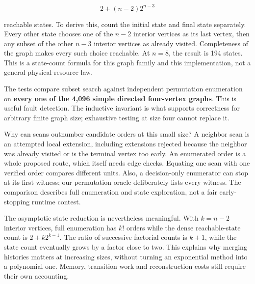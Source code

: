 \begin{equation}
2+(n-2)2^{n-3}
\end{equation}

reachable states. To derive this, count the initial state and final
state separately. Every other state chooses one of the \(n-2\) interior
vertices as its last vertex, then any subset of the other \(n-3\)
interior vertices as already visited. Completeness of the graph makes
every such choice reachable. At \(n=8\), the result is 194 states. This
is a state-count formula for this graph family and this implementation,
not a general physical-resource law.

The tests compare subset search against independent permutation
enumeration on \textbf{every one of the 4,096 simple directed
four-vertex graphs}. This is useful fault detection. The inductive
invariant is what supports correctness for arbitrary finite graph size;
exhaustive testing at size four cannot replace it.


Why can scans outnumber candidate orders at this small size? A neighbor
scan is an attempted local extension, including extensions rejected
because the neighbor was already visited or is the terminal vertex too
early. An enumerated order is a whole proposed route, which itself needs
edge checks. Equating one scan with one verified order compares
different units. Also, a decision-only enumerator can stop at its first
witness; our permutation oracle deliberately lists every witness. The
comparison describes full enumeration and state exploration, not a fair
early-stopping runtime contest.

The asymptotic state reduction is nevertheless meaningful. With
\(k=n-2\) interior vertices, full enumeration has \(k!\) orders while
the dense reachable-state count is \(2+k2^{k-1}\). The ratio of
successive factorial counts is \(k+1\), while the state count eventually
grows by a factor close to two. This explains why merging histories
matters at increasing sizes, without turning an exponential method into
a polynomial one. Memory, transition work and reconstruction costs still
require their own accounting.

